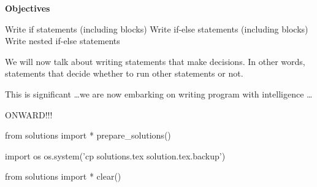 
\textbf{Objectives}
\begin{tightlist}
\li
  Write if statements (including blocks)
\li
  Write if-else statements (including blocks)
\li
  Write nested if-else statements
\end{tightlist}

We will now talk about writing statements that make decisions. In other
words, statements that decide whether to run other statements or not.

This is significant \dots we are now embarking on writing program
with intelligence \dots

ONWARD!!!









\begin{python0}
from solutions import *
prepare_solutions()
\end{python0}
\begin{python}
import os
os.system('cp solutions.tex solution.tex.backup')  
\end{python}

\begin{python0}
from solutions import *
clear()
\end{python0}
